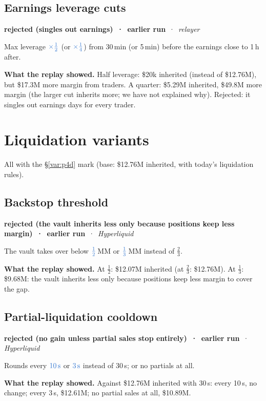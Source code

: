 \documentclass[10.5pt,a4paper]{article}
\newcommand{\chg}[1]{\ensuremath{{\color[HTML]{2F74D0}#1}}}
\newcommand{\st}[3]{\textcolor{#1}{\textbf{#2}} \,·\, \emph{#3}\par}
\newcommand{\res}[1]{\par\textbf{What the replay showed.} #1\par}
\begin{document}
\subsection{Earnings leverage cuts}\label{var:auto11}
\st{rej}{rejected (singles out earnings) \,·\, earlier run}{relayer}
Max leverage $\chg{\times\tfrac12}$ (or $\chg{\times\tfrac14}$) from 30\,min (or 5\,min) before the earnings close to 1\,h after.
\res{Half leverage: \$20k inherited (instead of \$12.76M), but \$17.3M more margin from traders. A quarter: \$5.29M inherited, \$49.8M more margin (the larger cut inherits more; we have not explained why). Rejected: it singles out earnings days for every trader.}

\section{Liquidation variants}\label{sec:liq}
All with the \S\ref{var:p4d} mark (base: \$12.76M inherited, with today's liquidation rules).

\subsection{Backstop threshold}\label{var:auto12}
\st{rej}{rejected (the vault inherits less only because positions keep less margin) \,·\, earlier run}{Hyperliquid}
The vault takes over below $\chg{\tfrac12}$\,MM or $\chg{\tfrac13}$\,MM instead of $\tfrac23$.
\res{At $\tfrac12$: \$12.07M inherited (at $\tfrac23$: \$12.76M). At $\tfrac13$: \$9.68M: the vault inherits less only because positions keep less margin to cover the gap.}

\subsection{Partial-liquidation cooldown}\label{var:auto13}
\st{rej}{rejected (no gain unless partial sales stop entirely) \,·\, earlier run}{Hyperliquid}
Rounds every $\chg{10\,\text{s}}$ or $\chg{3\,\text{s}}$ instead of 30\,s; or no partials at all.
\res{Against \$12.76M inherited with 30\,s: every 10\,s, no change; every 3\,s, \$12.61M; no partial sales at all, \$10.89M.}
\end{document}
